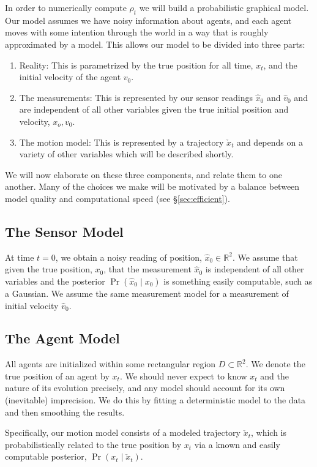 \documentclass[conference]{IEEEtran}
\begin{document}
In order to numerically compute $\rho_t$ we will build a probabilistic graphical model.
Our model assumes we have noisy information about agents, and each agent moves with some intention through the world in a way that is roughly approximated by a model.
This allows our model to be divided into three parts:
\begin{enumerate}
	\item Reality:  This is parametrized by the true position for all time, $x_t$, and the initial velocity of the agent $v_0$.
	\item The measurements:  This is represented by our sensor readings $\hat{x}_0$ and $\hat{v}_0$ and are independent of all other variables given the true initial position and velocity, $x_o, v_0$.
	\item The motion model:  This is represented by a trajectory $\check{x}_t$ and depends on a variety of other variables which will be described shortly.
\end{enumerate}
We will now elaborate on these three components, and relate them to one another.
Many of the choices we make will be motivated by a balance between model quality and computational speed (see \S \ref{sec:efficient}).

\subsection{The Sensor Model}
At time $t=0$, we obtain a noisy reading of position, $\hat{x}_0 \in \mathbb{R}^2$.
We assume that given the true position, $x_0$, that the measurement $\hat{x}_0$ is independent of all other variables and the posterior $\Pr( \hat{x}_0 \mid x_0)$
is something easily computable, such as a Gaussian.
We assume the same measurement model for a measurement of initial velocity $\hat{v}_0$.

\subsection{The Agent Model}
All agents are initialized within some rectangular region $D \subset \mathbb{R}^2$.
We denote the true position of an agent by $x_t$.
We should never expect to know $x_t$ and the nature of its evolution precisely, and any model should account for its own (inevitable) imprecision.
We do this by fitting a deterministic model to the data and then smoothing the results.

Specifically, our motion model consists of a modeled trajectory $\check{x}_t$, which is probabilistically related to the true position by $x_t$ via a known and easily computable posterior, $\Pr(x_t \mid \check{x}_t)$.
\end{document}
